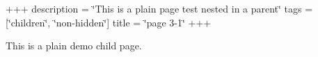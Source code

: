 +++ description = \char`\"{}\+This is a plain page test nested in a parent\char`\"{} tags = \mbox{[}\char`\"{}children\char`\"{}, \char`\"{}non-\/hidden\char`\"{}\mbox{]} title = \char`\"{}page 3-\/1\char`\"{} +++

This is a plain demo child page. 